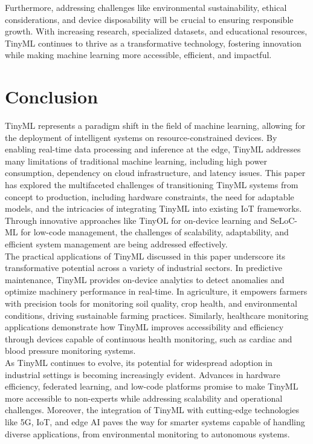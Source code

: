 \documentclass[twocolumn]{article}
\begin{document}
Furthermore, addressing challenges like environmental sustainability, ethical considerations, and device disposability will be crucial to ensuring responsible growth. With increasing research, specialized datasets, and educational resources, TinyML continues to thrive as a transformative technology, fostering innovation while making machine learning more accessible, efficient, and impactful.\cite{prakash_tinyml_2024}


\section{Conclusion}
\label{conclusion}

TinyML represents a paradigm shift in the field of machine learning, allowing for the deployment of intelligent systems on resource-constrained devices. By enabling real-time data processing and inference at the edge, TinyML addresses many limitations of traditional machine learning, including high power consumption, dependency on cloud infrastructure, and latency issues. This paper has explored the multifaceted challenges of transitioning TinyML systems from concept to production, including hardware constraints, the need for adaptable models, and the intricacies of integrating TinyML into existing IoT frameworks. Through innovative approaches like TinyOL for on-device learning and SeLoC-ML for low-code management, the challenges of scalability, adaptability, and efficient system management are being addressed effectively.\\[0.1cm]

The practical applications of TinyML discussed in this paper underscore its transformative potential across a variety of industrial sectors. In predictive maintenance, TinyML provides on-device analytics to detect anomalies and optimize machinery performance in real-time. In agriculture, it empowers farmers with precision tools for monitoring soil quality, crop health, and environmental conditions, driving sustainable farming practices. Similarly, healthcare monitoring applications demonstrate how TinyML improves accessibility and efficiency through devices capable of continuous health monitoring, such as cardiac and blood pressure monitoring systems.\\[0.1cm]

As TinyML continues to evolve, its potential for widespread adoption in industrial settings is becoming increasingly evident. Advances in hardware efficiency, federated learning, and low-code platforms promise to make TinyML more accessible to non-experts while addressing scalability and operational challenges. Moreover, the integration of TinyML with cutting-edge technologies like 5G, IoT, and edge AI paves the way for smarter systems capable of handling diverse applications, from environmental monitoring to autonomous systems.\\[0.1cm]
\end{document}
